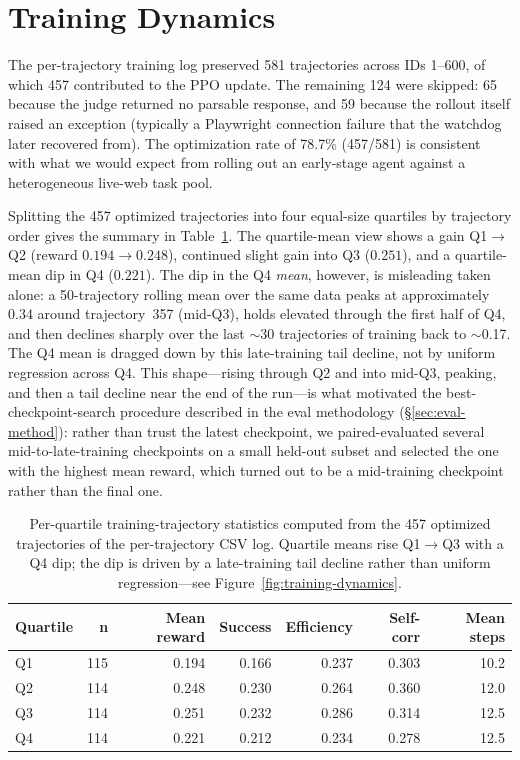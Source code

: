 \documentclass[12pt,a4paper]{report}
\begin{document}
\section{Training Dynamics}\label{sec:training-dynamics}

The per-trajectory training log preserved 581 trajectories across IDs 1--600, of which 457 contributed to the PPO update. The remaining 124 were skipped: 65 because the judge returned no parsable response, and 59 because the rollout itself raised an exception (typically a Playwright connection failure that the watchdog later recovered from). The optimization rate of 78.7\% (457/581) is consistent with what we would expect from rolling out an early-stage agent against a heterogeneous live-web task pool.

Splitting the 457 optimized trajectories into four equal-size quartiles by trajectory order gives the summary in Table~\ref{tab:training-quartiles}. The quartile-mean view shows a gain Q1$\to$Q2 (reward $0.194 \to 0.248$), continued slight gain into Q3 ($0.251$), and a quartile-mean dip in Q4 ($0.221$). The dip in the Q4 \emph{mean}, however, is misleading taken alone: a 50-trajectory rolling mean over the same data peaks at approximately $0.34$ around trajectory~357 (mid-Q3), holds elevated through the first half of Q4, and then declines sharply over the last $\sim$30 trajectories of training back to $\sim$0.17. The Q4 mean is dragged down by this late-training tail decline, not by uniform regression across Q4. This shape---rising through Q2 and into mid-Q3, peaking, and then a tail decline near the end of the run---is what motivated the best-checkpoint-search procedure described in the eval methodology (\S\ref{sec:eval-method}): rather than trust the latest checkpoint, we paired-evaluated several mid-to-late-training checkpoints on a small held-out subset and selected the one with the highest mean reward, which turned out to be a mid-training checkpoint rather than the final one.

\begin{table}[h]
\centering
\begin{tabular}{lrrrrrr}
\toprule
\textbf{Quartile} & \textbf{n} & \textbf{Mean reward} & \textbf{Success} & \textbf{Efficiency} & \textbf{Self-corr} & \textbf{Mean steps} \\
\midrule
Q1 & 115 & 0.194 & 0.166 & 0.237 & 0.303 & 10.2 \\
Q2 & 114 & 0.248 & 0.230 & 0.264 & 0.360 & 12.0 \\
Q3 & 114 & 0.251 & 0.232 & 0.286 & 0.314 & 12.5 \\
Q4 & 114 & 0.221 & 0.212 & 0.234 & 0.278 & 12.5 \\
\bottomrule
\end{tabular}
\caption{Per-quartile training-trajectory statistics computed from the 457 optimized trajectories of the per-trajectory CSV log. Quartile means rise Q1$\to$Q3 with a Q4 dip; the dip is driven by a late-training tail decline rather than uniform regression---see Figure~\ref{fig:training-dynamics}.}
\label{tab:training-quartiles}
\end{table}
\end{document}
